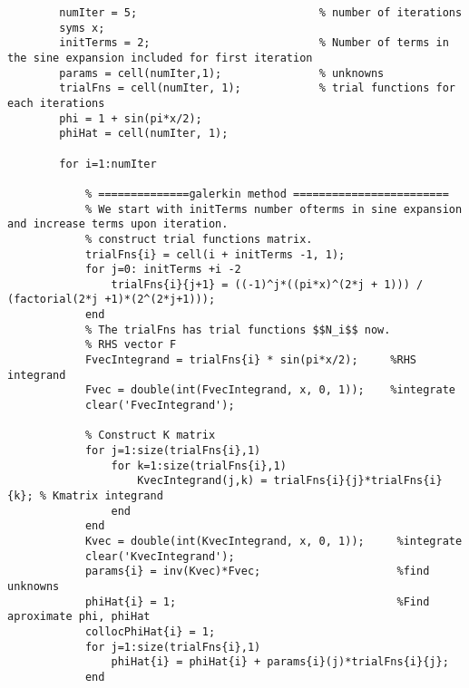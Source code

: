 \documentclass[11pt,paper=a4,answers]{exam}
\begin{document}
\begin{questions}
\begin{enumerate}[]
\begin{lstlisting}
        numIter = 5;                            % number of iterations
        syms x;
        initTerms = 2;                          % Number of terms in the sine expansion included for first iteration
        params = cell(numIter,1);               % unknowns
        trialFns = cell(numIter, 1);            % trial functions for each iterations
        phi = 1 + sin(pi*x/2);
        phiHat = cell(numIter, 1);

        for i=1:numIter

            % ==============galerkin method ========================
            % We start with initTerms number ofterms in sine expansion and increase terms upon iteration.
            % construct trial functions matrix.
            trialFns{i} = cell(i + initTerms -1, 1);
            for j=0: initTerms +i -2
                trialFns{i}{j+1} = ((-1)^j*((pi*x)^(2*j + 1))) / (factorial(2*j +1)*(2^(2*j+1)));
            end
            % The trialFns has trial functions $$N_i$$ now.
            % RHS vector F
            FvecIntegrand = trialFns{i} * sin(pi*x/2);     %RHS integrand
            Fvec = double(int(FvecIntegrand, x, 0, 1));    %integrate
            clear('FvecIntegrand');

            % Construct K matrix
            for j=1:size(trialFns{i},1)
                for k=1:size(trialFns{i},1)
                    KvecIntegrand(j,k) = trialFns{i}{j}*trialFns{i}{k}; % Kmatrix integrand
                end
            end
            Kvec = double(int(KvecIntegrand, x, 0, 1));     %integrate
            clear('KvecIntegrand');
            params{i} = inv(Kvec)*Fvec;                     %find unknowns
            phiHat{i} = 1;                                  %Find aproximate phi, phiHat
            collocPhiHat{i} = 1;
            for j=1:size(trialFns{i},1)
                phiHat{i} = phiHat{i} + params{i}(j)*trialFns{i}{j};
            end


\end{lstlisting}
\end{enumerate}
\end{questions}
\end{document}
